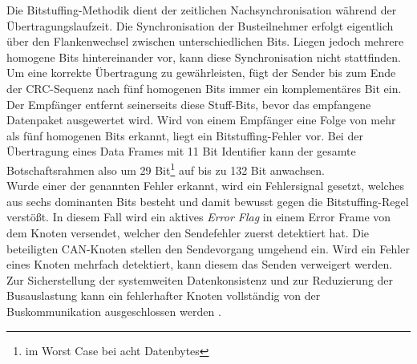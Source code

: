 Die Bitstuffing-Methodik dient der zeitlichen Nachsynchronisation während der Übertragungslaufzeit. Die Synchronisation der Busteilnehmer erfolgt eigentlich über den Flankenwechsel zwischen unterschiedlichen Bits. Liegen jedoch mehrere homogene Bits hintereinander vor, kann diese Synchronisation nicht stattfinden. Um eine korrekte Übertragung zu gewährleisten, fügt der Sender bis zum Ende der \acs{CRC}-Sequenz nach fünf homogenen Bits immer ein komplementäres Bit ein. Der Empfänger entfernt seinerseits diese Stuff-Bits, bevor das empfangene Datenpaket ausgewertet wird. Wird von einem Empfänger eine Folge von mehr als fünf homogenen Bits erkannt, liegt ein Bitstuffing-Fehler vor. Bei der Übertragung eines Data Frames mit 11 Bit Identifier kann der gesamte Botschaftsrahmen also um 29 Bit\footnote{im Worst Case bei acht Datenbytes} auf bis zu 132 Bit anwachsen. \\
Wurde einer der genannten Fehler erkannt, wird ein Fehlersignal gesetzt, welches aus sechs dominanten Bits besteht und damit bewusst gegen die Bitstuffing-Regel verstößt. In diesem Fall wird ein aktives \emph{Error Flag} in einem Error Frame von dem Knoten versendet, welcher den Sendefehler zuerst detektiert hat. Die beteiligten \acs{CAN}-Knoten stellen den Sendevorgang umgehend ein. Wird ein Fehler eines Knoten mehrfach detektiert, kann diesem das Senden verweigert werden. Zur Sicherstellung der systemweiten Datenkonsistenz und zur Reduzierung der Busauslastung kann ein fehlerhafter Knoten vollständig von der Buskommunikation ausgeschlossen werden \cite{Wallentowitz.2011, Zimmermann.2014, VectorInformatikGmbH.}.